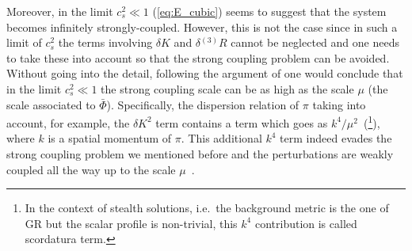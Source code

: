 \documentclass[a4paper,11pt]{article}
\numberwithin{equation}{section}
\begin{document}
Moreover, in the limit $c_s^2 \ll 1$ (\ref{eq:E_cubic}) seems to suggest that the system becomes infinitely strongly-coupled.  However, this is not the case since in such a limit of $c_s^2$ the terms involving $\delta K$ and $\delta {}^{(3)}\!R$ cannot be neglected and one needs to take these into account so that the strong coupling problem can be avoided. Without going into the detail, following the argument of \cite{Motohashi:2019ymr} one would conclude that in the limit $c_s^2 \ll 1$ the strong coupling scale can be as high as the scale $\mu$ (the scale associated to $\bar{\Phi}$). Specifically, the dispersion relation of $\pi$ taking into account, for example, the $\delta K^2$ term contains a term which goes as $k^4/\mu^2$~(\footnote{In the context of stealth solutions, i.e.~the background metric is the one of GR but the scalar profile is non-trivial, this $k^4$ contribution is called scordatura term.}), where $k$ is a spatial momentum of $\pi$. This additional $k^4$ term indeed evades the strong coupling problem we mentioned before and the perturbations are weakly coupled all the way up to the scale $\mu$~\cite{Arkani-Hamed:2003pdi,Motohashi:2019ymr}. 
\end{document}
